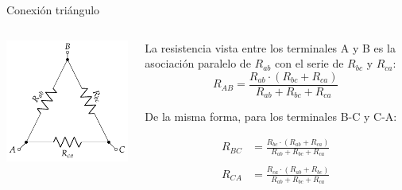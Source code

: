 \documentclass[aspectratio=169, xcolor={usenames,svgnames,dvipsnames}]{beamer}
\begin{document}
\begin{frame}
{Conexión triángulo}
    \begin{columns}
    \begin{column}{0.4\columnwidth}
    \begin{center}
    \includegraphics[width=1.1\linewidth]{../figs/Conexion_Triangulo.pdf}
    \end{center}
    \end{column}
    \begin{column}{0.5\columnwidth}
    La resistencia \alert{vista entre los terminales} A y B es la asociación paralelo de $R_{ab}$ con el serie de $R_{bc}$ y $R_{ca}$:
    \begin{equation*}
      R_{AB} = \frac{R_{ab} \cdot (R_{bc} + R_{ca})}{R_{ab} + R_{bc} + R_{ca}}
    \end{equation*}

    \vspace{3mm}
    De la misma forma, para los terminales B-C y C-A:

    \vspace{-6mm}
    \begin{align*}
      R_{BC} &= \frac{R_{bc} \cdot (R_{ab} + R_{ca})}{R_{ab} + R_{bc} + R_{ca}}\\
      \\
      R_{CA} &= \frac{R_{ca} \cdot (R_{ab} + R_{bc})}{R_{ab} + R_{bc} + R_{ca}}
    \end{align*}
    \end{column}
    \end{columns}
\end{frame}
\end{document}
